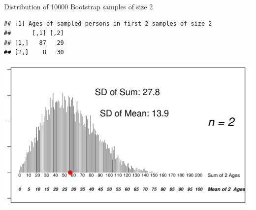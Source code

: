 \documentclass[10pt,handout]{beamer}\usepackage[]{graphicx}\usepackage[]{color}
\makeatletter
\def\maxwidth{ %
  \ifdim\Gin@nat@width>\linewidth
    \linewidth
  \else
    \Gin@nat@width
  \fi
}
\newenvironment{kframe}{%
 \def\at@end@of@kframe{}%
 \ifinner\ifhmode%
  \def\at@end@of@kframe{\end{minipage}}%
  \begin{minipage}{\columnwidth}%
 \fi\fi%
 \def\FrameCommand##1{\hskip\@totalleftmargin \hskip-\fboxsep
 \colorbox{shadecolor}{##1}\hskip-\fboxsep
     \hskip-\linewidth \hskip-\@totalleftmargin \hskip\columnwidth}%
 \MakeFramed {\advance\hsize-\width
   \@totalleftmargin\z@ \linewidth\hsize
   \@setminipage}}%
 {\par\unskip\endMakeFramed%
 \at@end@of@kframe}
\newenvironment{knitrout}{}{} %
\makeatother
\begin{document}
\begin{frame}[fragile]{Distribution of 10000 Bootstrap samples of size 2}
\begin{knitrout}\tiny
{}\color{fgcolor}\begin{kframe}
\begin{verbatim}
## [1] Ages of sampled persons in first 2 samples of size 2
##      [,1] [,2]
## [1,]   87   29
## [2,]    8   30
\end{verbatim}
\end{kframe}

{\centering \includegraphics[width=\maxwidth]{figure/unnamed-chunk-2-1} 

}



\end{knitrout}
	
\end{frame}
\end{document}

